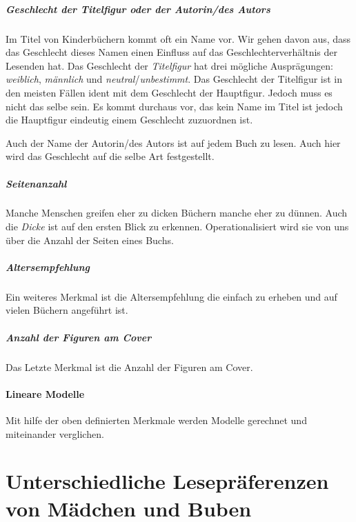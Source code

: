 \paragraph{Geschlecht der Titelfigur oder der Autorin/des Autors}

Im Titel von Kinderbüchern kommt oft ein Name vor. Wir gehen davon aus,
dass das Geschlecht dieses Namen einen Einfluss auf das
Geschlechterverhältnis der Lesenden hat. Das Geschlecht der
\emph{Titelfigur} hat drei mögliche Ausprägungen: \emph{weiblich},
\emph{männlich} und \emph{neutral}/\emph{unbestimmt}. Das Geschlecht der
Titelfigur ist in den meisten Fällen ident mit dem Geschlecht der
Hauptfigur. Jedoch muss es nicht das selbe sein. Es kommt durchaus vor,
das kein Name im Titel ist jedoch die Hauptfigur eindeutig einem
Geschlecht zuzuordnen ist.

Auch der Name der Autorin/des Autors ist auf jedem Buch zu lesen. Auch
hier wird das Geschlecht auf die selbe Art festgestellt.

\paragraph{Seitenanzahl}

Manche Menschen greifen eher zu dicken Büchern manche eher zu dünnen.
Auch die \emph{Dicke} ist auf den ersten Blick zu erkennen.
Operationalisiert wird sie von uns über die Anzahl der Seiten eines
Buchs.

\paragraph{Altersempfehlung}

Ein weiteres Merkmal ist die Altersempfehlung die einfach zu erheben und
auf vielen Büchern angeführt ist.

\paragraph{Anzahl der Figuren am Cover}

Das Letzte Merkmal ist die Anzahl der Figuren am Cover.

\subsubsection{Lineare Modelle}

Mit hilfe der oben definierten Merkmale werden Modelle gerechnet und
miteinander verglichen.

\chapter{Unterschiedliche Lesepräferenzen von Mädchen und Buben}

